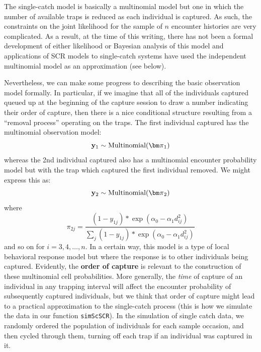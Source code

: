 The single-catch model is basically a multinomial model but one in
which the number of available traps is reduced as each individual is
captured. As such, the constraints on the joint likelihood for the
sample of $n$ encounter histories are very complicated.
 As a
result, at the time of this writing, there has not been a formal
development of either likelihood or Bayesian analysis of this model
and applications of SCR models to single-catch systems have used the
independent multinomial model as an approximation (see below).

Nevertheless, we can make some progress to describing the basic
observation model
formally. In particular, if we imagine that all of the individuals
captured queued up at the beginning of the capture session to draw a
number indicating their order of capture, then there is a nice conditional structure
resulting from a ``removal process'' operating on the traps.  The
first individual captured has the multinomial observation model:
\[
{\bf y}_{1} \sim \mbox{Multinomial}({\bm \pi}_{1})
\]
whereas the 2nd individual captured also has a multinomial encounter
probability model but with the trap which captured the first
individual removed. We might express this as:
\[
{\bf y}_{2} \sim \mbox{Multinomial}({\bm \pi}_{2})
\]
where
\[
 \pi_{2j}  = \frac{ (1-y_{1j}) * \exp( \alpha_{0} - \alpha_{1}   d_{ij}^{2}) }
{ \sum_{j} (1-y_{1j}) * \exp( \alpha_{0} - \alpha_{1}   d_{ij}^{2}) }
\]
and so on for $i=3,4,\ldots,n$.
 In a certain way, this model is a type of local behavioral
response model but where the response is to other individuals being
captured.
Evidently, the {\bf order of capture} is relevant to the
construction of these multinomial cell probabilities. More generally,
the {\it time} of capture of an individual in any trapping interval
will affect the encounter probability of subsequently captured
individuals, but we think that %
order of capture might lead to a
practical approximation to the single-catch process (this is how we
simulate the data in our function \mbox{\tt simScSCR}).
In the
simulation of single catch data, we randomly ordered the population of
individuals for each sample occasion,
and then cycled through them, turning off each trap if an individual
was captured in it.


